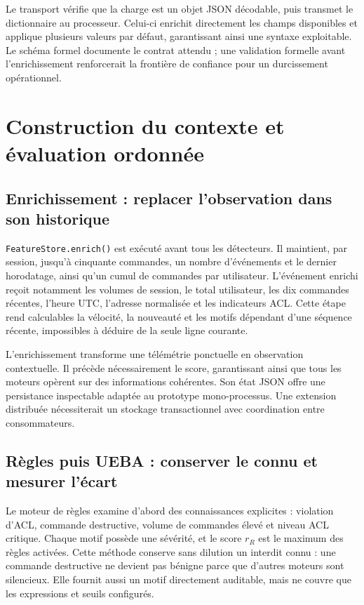 \documentclass[11pt,a4paper,oneside]{report}
\theoremstyle{definition}
\theoremstyle{plain}
\begin{document}
Le transport vérifie que la charge est un objet JSON décodable, puis transmet
le dictionnaire au processeur. Celui-ci enrichit directement les champs
disponibles et applique plusieurs valeurs par défaut, garantissant ainsi une
syntaxe exploitable. Le schéma formel 
documente le contrat attendu ; une validation formelle avant l'enrichissement
renforcerait la frontière de confiance pour un durcissement opérationnel.

\section{Construction du contexte et évaluation ordonnée}

\subsection{Enrichissement : replacer l'observation dans son historique}

\texttt{FeatureStore.enrich()} est exécuté avant tous les détecteurs. Il
maintient, par session, jusqu'à cinquante commandes, un nombre d'événements et
le dernier horodatage, ainsi qu'un cumul de commandes par utilisateur.
L'événement enrichi reçoit notamment les volumes de session, le total
utilisateur, les dix commandes récentes, l'heure UTC, l'adresse normalisée et
les indicateurs ACL. Cette étape rend calculables la vélocité, la nouveauté et
les motifs dépendant d'une séquence récente, impossibles à déduire de la seule
ligne courante.

L'enrichissement transforme une télémétrie ponctuelle en observation
contextuelle. Il précède nécessairement le score, garantissant ainsi que tous
les moteurs opèrent sur des informations cohérentes. Son état JSON offre une
persistance inspectable adaptée au prototype mono-processus. Une extension
distribuée nécessiterait un stockage transactionnel avec coordination entre
consommateurs.

\subsection{Règles puis UEBA : conserver le connu et mesurer l'écart}

Le moteur de règles examine d'abord des connaissances explicites : violation
d'ACL, commande destructive, volume de commandes élevé et niveau ACL
critique. Chaque motif possède une sévérité, et le score \(r_R\) est le maximum
des règles activées. Cette méthode conserve sans dilution un interdit connu :
une commande destructive ne devient pas bénigne parce que d'autres moteurs
sont silencieux. Elle fournit aussi un motif directement auditable, mais ne
couvre que les expressions et seuils configurés.
\end{document}
